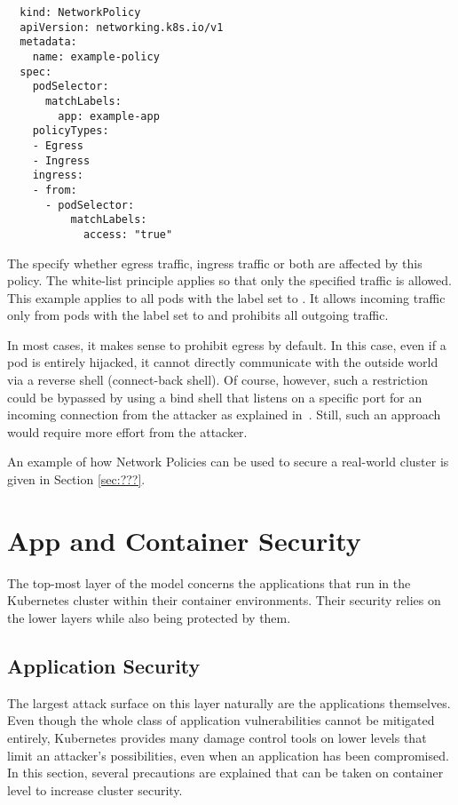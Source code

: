 \begin{verbatim}
  kind: NetworkPolicy
  apiVersion: networking.k8s.io/v1
  metadata:
    name: example-policy
  spec:
    podSelector:
      matchLabels:
        app: example-app
    policyTypes:
    - Egress
    - Ingress
    ingress:
    - from:
      - podSelector:
          matchLabels:
            access: "true"
\end{verbatim}

The  specify whether egress traffic, ingress traffic or both are affected by this policy. The white-list principle applies so that only the specified traffic is allowed. This example applies to all pods with the label  set to . It allows incoming traffic only from pods with the label  set to  and prohibits all outgoing traffic.

In most cases, it makes sense to prohibit egress by default. In this case, even if a pod is entirely hijacked, it cannot directly communicate with the outside world via a reverse shell (connect-back shell). Of course, however, such a restriction could be bypassed by using a bind shell that listens on a specific port for an incoming connection from the attacker as explained in~\textcite{bindAndReverseShells}. Still, such an approach would require more effort from the attacker.

An example of how Network Policies can be used to secure a real-world cluster is given in Section \ref{sec:???}. %

\section{App and Container Security} \label{sec:layer4}

The top-most layer of the model concerns the applications that run in the Kubernetes cluster within their container environments. Their security relies on the lower layers while also being protected by them.

\subsection{Application Security}

The largest attack surface on this layer naturally are the applications themselves. Even though the whole class of application vulnerabilities cannot be mitigated entirely, Kubernetes provides many damage control tools on lower levels that limit an attacker's possibilities, even when an application has been compromised. In this section, several precautions are explained that can be taken on container level to increase cluster security.

